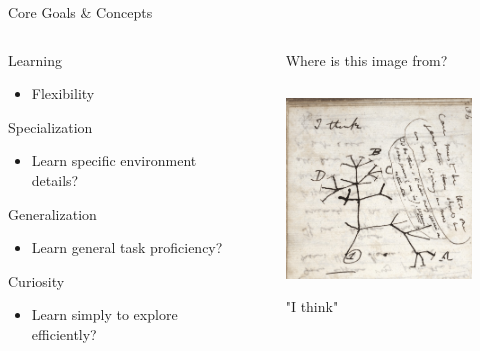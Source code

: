 \documentclass[aspectratio=169]{beamer}
\begin{document}
\begin{frame}[plain]{{\color{pureminimalistic@text@white} Core Goals \& Concepts}}
  \begin{columns}[T]
      \begin{column}{.6\linewidth}
          \begin{vfilleditems}
            \item {\Huge \color{pureminimalistic@text@red} Learning}
              \begin{itemize}
                \item {\Medium Flexibility}
              \end{itemize}
            \item {\Huge \color{pureminimalistic@text@red} Specialization}
              \begin{itemize}
                \item {\Medium Learn specific environment details?}
              \end{itemize}
            \item {\Huge \color{pureminimalistic@text@red} Generalization}
              \begin{itemize}
                \item {\Medium Learn general task proficiency?}
              \end{itemize}
            \item {\Huge \color{pureminimalistic@text@red} Curiosity}
              \begin{itemize}
                \item {\Medium Learn simply to explore efficiently?}
              \end{itemize}
          \end{vfilleditems}
      \end{column}
      \begin{column}{.4\linewidth}
          \begin{figure}
              \centering
              \caption{Where is this image from?}
              \includegraphics[height=5.5cm, keepaspectratio]{figures/i_think.png}
              \caption{"I think"}
              \label{fig:my_label}
          \end{figure}
      \end{column}
  \end{columns}
\end{frame}
\end{document}
